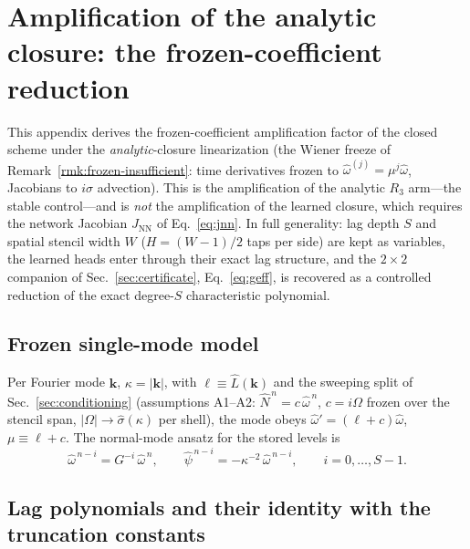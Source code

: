 \documentclass[11pt]{article}
\theoremstyle{plain}
\theoremstyle{definition}
\begin{document}
\section{Amplification of the analytic closure: the frozen-coefficient reduction}
\label{app:vn}

This appendix derives the frozen-coefficient amplification factor of the
closed scheme under the \emph{analytic}-closure linearization (the Wiener
freeze of Remark~\ref{rmk:frozen-insufficient}: time derivatives frozen to
$\hat\omega^{(j)}=\mu^{j}\hat\omega$, Jacobians to $i\sigma$ advection). This
is the amplification of the analytic $R_3$ arm---the stable control---and is
\emph{not} the amplification of the learned closure, which requires the
network Jacobian $J_{\mathrm{NN}}$ of Eq.~\eqref{eq:jnn}. In full generality:
lag depth $S$
and spatial stencil width $W$ ($H=(W-1)/2$ taps per side) are kept as
variables, the learned heads enter through their exact lag structure, and
the $2\times2$ companion of Sec.~\ref{sec:certificate}, Eq.~\eqref{eq:geff}, is recovered as a
controlled reduction of the exact degree-$S$ characteristic polynomial.

\subsection{Frozen single-mode model}

Per Fourier mode $\mathbf{k}$, $\kappa=|\mathbf{k}|$, with
$\ell\equiv\hat L(\mathbf{k})$ and the sweeping split of Sec.~\ref{sec:conditioning}
(assumptions A1--A2: $\hat N^{\,n}=c\,\hat\omega^{\,n}$, $c=i\Omega$
frozen over the stencil span, $|\Omega|\to\hat\sigma(\kappa)$ per shell),
the mode obeys $\hat\omega'=(\ell+c)\hat\omega$, $\mu\equiv\ell+c$. The
normal-mode ansatz for the stored levels is
\begin{equation}
\hat\omega^{\,n-i}=G^{-i}\,\hat\omega^{\,n},\qquad
\hat\psi^{\,n-i}=-\kappa^{-2}\,\hat\omega^{\,n-i},
\qquad i=0,\dots,S-1 .
\label{eq:vn-ansatz}
\end{equation}

\subsection{Lag polynomials and their identity with the truncation
constants}
\end{document}
